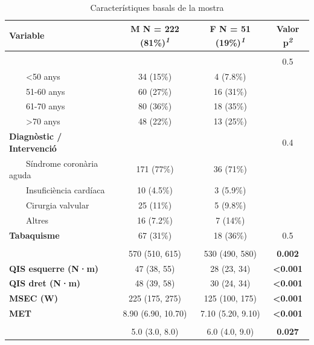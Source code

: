 \documentclass[CAT]{TFUOC}%
\begin{document}
\begin{table}[t]
\caption{\label{tab:table-1}Característiques basals de la mostra} 
\fontsize{12.0pt}{14.0pt}\selectfont
\begin{tabular*}{\linewidth}{@{\extracolsep{\fill}}lccc}
\toprule
\textbf{Variable} & \textbf{M} \textbar{} N = 222 (81\%)\textsuperscript{\textit{1}} & \textbf{F} \textbar{} N = 51 (19\%)\textsuperscript{\textit{1}} & \textbf{Valor p}\textsuperscript{\textit{2}} \\ 
\midrule\addlinespace[2.5pt]
\multicolumn{4}{l}{Demogràfics} \\[2.5pt] 
\midrule\addlinespace[2.5pt]
{\bfseries Grup d'edat} &  &  & 0.5 \\ 
    <50 anys & 34 (15\%) & 4 (7.8\%) &  \\ 
    51-60 anys & 60 (27\%) & 16 (31\%) &  \\ 
    61-70 anys & 80 (36\%) & 18 (35\%) &  \\ 
    >70 anys & 48 (22\%) & 13 (25\%) &  \\ 
{\bfseries Diagnòstic / Intervenció} &  &  & 0.4 \\ 
    Síndrome coronària aguda & 171 (77\%) & 36 (71\%) &  \\ 
    Insuficiència cardíaca & 10 (4.5\%) & 3 (5.9\%) &  \\ 
    Cirurgia valvular & 25 (11\%) & 5 (9.8\%) &  \\ 
    Altres & 16 (7.2\%) & 7 (14\%) &  \\ 
{\bfseries Tabaquisme} & 67 (31\%) & 18 (36\%) & 0.5 \\ 
\midrule\addlinespace[2.5pt]
\multicolumn{4}{l}{Capacitat funcional} \\[2.5pt] 
\midrule\addlinespace[2.5pt]
{\bfseries 6MWT (m)} & 570 (510, 615) & 530 (490, 580) & {\bfseries 0.002} \\ 
{\bfseries QIS esquerre (N·m)} & 47 (38, 55) & 28 (23, 34) & {\bfseries <0.001} \\ 
{\bfseries QIS dret (N·m)} & 48 (39, 58) & 30 (24, 34) & {\bfseries <0.001} \\ 
{\bfseries MSEC (W)} & 225 (175, 275) & 125 (100, 175) & {\bfseries <0.001} \\ 
{\bfseries MET} & 8.90 (6.90, 10.70) & 7.10 (5.20, 9.10) & {\bfseries <0.001} \\ 
\midrule\addlinespace[2.5pt]
\multicolumn{4}{l}{Qüestionaris de salut} \\[2.5pt] 
\midrule\addlinespace[2.5pt]
{\bfseries HADS | Depressió} & 5.0 (3.0, 8.0) & 6.0 (4.0, 9.0) & {\bfseries 0.027} \\ 

\end{tabular*}
\end{table}
\end{document}
